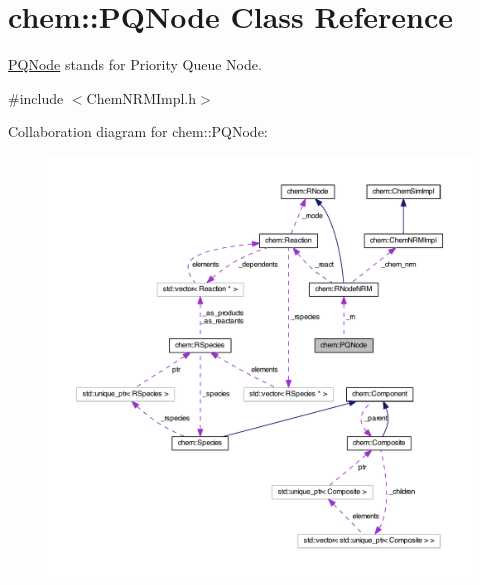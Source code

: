 \hypertarget{classchem_1_1PQNode}{\section{chem\-:\-:P\-Q\-Node Class Reference}
\label{classchem_1_1PQNode}
}


\hyperlink{classchem_1_1PQNode}{P\-Q\-Node} stands for Priority Queue Node.  




{\ttfamily \#include $<$Chem\-N\-R\-M\-Impl.\-h$>$}



Collaboration diagram for chem\-:\-:P\-Q\-Node\-:
\nopagebreak
\begin{figure}[H]
\begin{center}
\leavevmode
\includegraphics[width=350pt]{classchem_1_1PQNode__coll__graph}
\end{center}
\end{figure}
